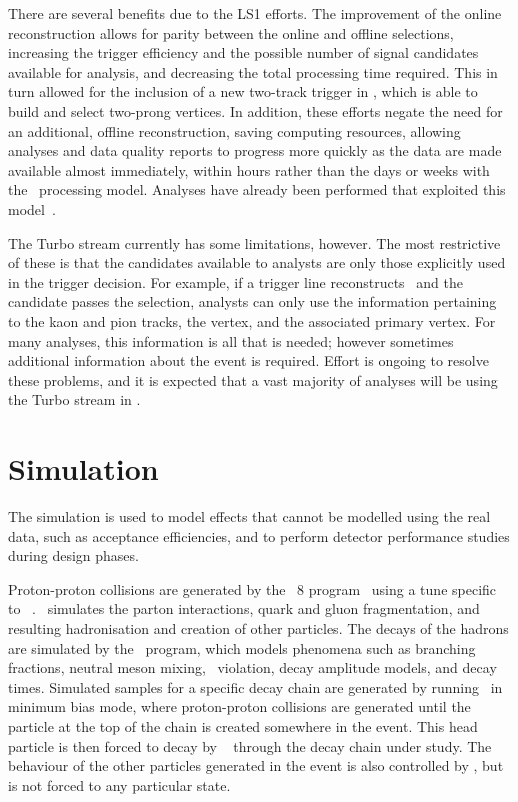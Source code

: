 There are several benefits due to the \ac{LS1} efforts.
The improvement of the online reconstruction allows for parity between the 
online and offline selections, increasing the trigger efficiency and the 
possible number of signal candidates available for analysis, and decreasing the 
total processing time required.
This in turn allowed for the inclusion of a new two-track trigger in \hltone, 
which is able to build and select two-prong vertices.
In addition, these efforts negate the need for an additional, offline 
reconstruction, saving computing resources,
 allowing analyses and data quality reports to progress more quickly as the 
 data are made available almost immediately, within hours rather than the days 
 or weeks with the \runone\ processing model.
 Analyses have already been performed that exploited this 
 model~\cite{LHCb-PAPER-2015-037,Aaij:2015bpa,Aaij:2016jht}.

 The Turbo stream currently has some limitations, however.
 The most restrictive of these is that the candidates available to analysts are 
 only those explicitly used in the trigger decision.
 For example, if a trigger line reconstructs \DzToKpi\ and the candidate passes 
 the selection, analysts can only use the information pertaining to the kaon 
 and pion tracks, the \PDzero vertex, and the associated primary vertex.
 For many analyses, this information is all that is needed; however sometimes 
 additional information about the event is required.
 Effort is ongoing to resolve these problems, and it is expected that a vast 
 majority of analyses will be using the Turbo stream in \runthree.

\section{Simulation}
\label{chap:intro:lhcb:simulation}

The simulation is used to model effects that cannot be modelled using the real 
data, such as acceptance efficiencies, and to perform detector performance 
studies during design phases.

Proton-proton collisions are generated by the \pythia\ 8 
program~\cite{Sjostrand:2007gs} using a tune specific to 
\lhcb~\cite{Belyaev:1322400}.
\pythia\ simulates the parton interactions, quark and gluon fragmentation, and 
resulting hadronisation and creation of other particles.
The decays of the hadrons are simulated by the \evtgen\ program, which models 
phenomena such as branching fractions, neutral meson mixing, \CP\ violation, 
decay amplitude models, and decay times.
Simulated samples for a specific decay chain are generated by running \pythia\ 
in minimum bias mode, where proton-proton collisions are generated until the 
particle at the top of the chain is created somewhere in the event.
This head particle is then forced to decay by \evtgen~\cite{Clemencic:2011zza} 
through the decay chain under study.
The behaviour of the other particles generated in the event is also controlled 
by \evtgen, but is not forced to any particular state.

